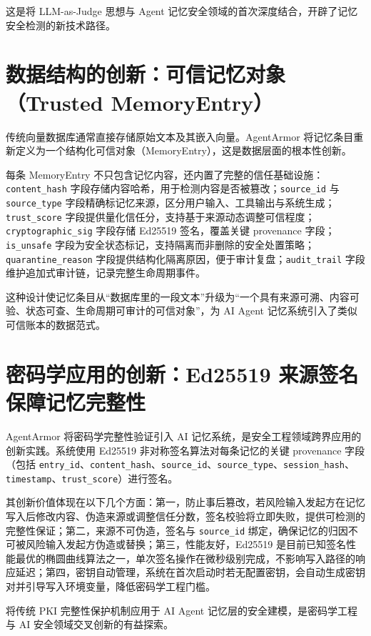 \documentclass[UTF8,zihao=-4,oneside,fontset=none]{ctexrep}
\begin{document}
	这是将 LLM-as-Judge 思想与 Agent 记忆安全领域的首次深度结合，开辟了记忆安全检测的新技术路径。
	
	\section{数据结构的创新：可信记忆对象（Trusted MemoryEntry）}
	传统向量数据库通常直接存储原始文本及其嵌入向量。AgentArmor 将记忆条目重新定义为一个结构化可信对象（MemoryEntry），这是数据层面的根本性创新。
	
	每条 MemoryEntry 不只包含记忆内容，还内置了完整的信任基础设施：\texttt{content\_hash} 字段存储内容哈希，用于检测内容是否被篡改；\texttt{source\_id} 与 \texttt{source\_type} 字段精确标记忆来源，区分用户输入、工具输出与系统生成；\texttt{trust\_score} 字段提供量化信任分，支持基于来源动态调整可信程度；\texttt{cryptographic\_sig} 字段存储 Ed25519 签名，覆盖关键 provenance 字段；\texttt{is\_unsafe} 字段为安全状态标记，支持隔离而非删除的安全处置策略；\texttt{quarantine\_reason} 字段提供结构化隔离原因，便于审计复盘；\texttt{audit\_trail} 字段维护追加式审计链，记录完整生命周期事件。
	
	这种设计使记忆条目从“数据库里的一段文本”升级为“一个具有来源可溯、内容可验、状态可查、生命周期可审计的可信对象”，为 AI Agent 记忆系统引入了类似可信账本的数据范式。
	
	\section{密码学应用的创新：Ed25519 来源签名保障记忆完整性}
	AgentArmor 将密码学完整性验证引入 AI 记忆系统，是安全工程领域跨界应用的创新实践。系统使用 Ed25519 非对称签名算法对每条记忆的关键 provenance 字段（包括 \texttt{entry\_id}、\texttt{content\_hash}、\texttt{source\_id}、\texttt{source\_type}、\texttt{session\_hash}、\texttt{timestamp}、\texttt{trust\_score}）进行签名。
	
	其创新价值体现在以下几个方面：第一，防止事后篡改，若风险输入发起方在记忆写入后修改内容、伪造来源或调整信任分数，签名校验将立即失败，提供可检测的完整性保证；第二，来源不可伪造，签名与 \texttt{source\_id} 绑定，确保记忆的归因不可被风险输入发起方伪造或替换；第三，性能友好，Ed25519 是目前已知签名性能最优的椭圆曲线算法之一，单次签名操作在微秒级别完成，不影响写入路径的响应延迟；第四，密钥自动管理，系统在首次启动时若无配置密钥，会自动生成密钥对并引导写入环境变量，降低密码学工程门槛。
	
	将传统 PKI 完整性保护机制应用于 AI Agent 记忆层的安全建模，是密码学工程与 AI 安全领域交叉创新的有益探索。
	
\end{document}
